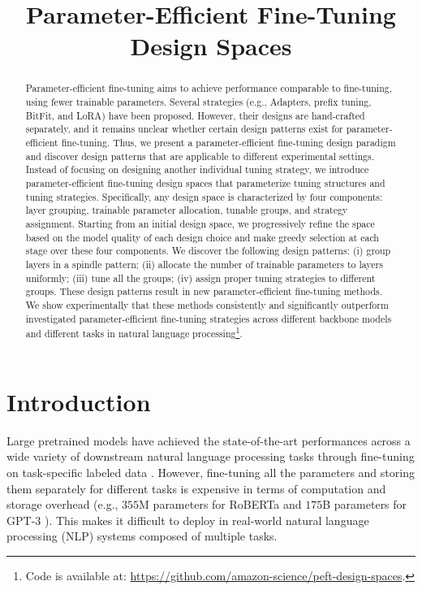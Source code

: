 \title{Parameter-Efficient Fine-Tuning Design Spaces}

\begin{abstract}
Parameter-efficient fine-tuning aims to achieve performance comparable to fine-tuning, using fewer trainable parameters. Several strategies (e.g., Adapters, prefix tuning, BitFit, and LoRA) have been proposed. However, their designs are hand-crafted separately, and it remains unclear whether certain design patterns exist for parameter-efficient fine-tuning. Thus, we present a parameter-efficient fine-tuning design paradigm and discover design patterns that are applicable to different experimental settings. Instead of focusing on designing another individual tuning strategy, we introduce parameter-efficient fine-tuning design spaces that parameterize  tuning structures and tuning strategies. Specifically, any design space is characterized by four components: layer grouping, trainable parameter allocation, tunable groups, and strategy assignment. Starting from an initial design space, we progressively refine the space based on the model quality of each design choice and make greedy selection at each stage over these four components. We discover the following design patterns: (i) group layers in a spindle pattern; (ii) allocate the number of trainable parameters to layers uniformly; (iii) tune all the groups; (iv) assign proper tuning strategies to different groups. These design patterns result in new parameter-efficient fine-tuning methods. We show experimentally that these methods consistently and significantly outperform investigated parameter-efficient fine-tuning strategies across different backbone models and different tasks in natural language processing\footnote{Code is available at: \url{https://github.com/amazon-science/peft-design-spaces}.}.
\end{abstract}

\section{Introduction}
Large pretrained models have achieved the state-of-the-art performances across a wide variety of downstream natural language processing tasks through fine-tuning on task-specific labeled data \citep{devlin2018bert, liu2019roberta, yang2019xlnet, joshi2019spanbert, sun2019ernie, clark2019electra, lewis2019bart, bao2020unilmv2, he2020deberta, raffel2020exploring, ziems-etal-2022-value}. However, fine-tuning all the parameters and storing them separately for different tasks is expensive in terms of computation and storage overhead (e.g., $355$M parameters for RoBERTa \citep{liu2019roberta} and $175$B parameters for GPT-$3$ \citep{brown2020language}). This makes it difficult to deploy in real-world natural language processing (NLP) systems composed of multiple tasks.

